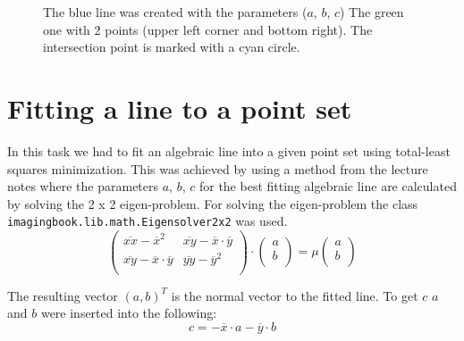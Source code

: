 \begin{figure}
	\centering
	\caption{The blue line was created with the parameters ($a$, $b$, $c$) The green one with 2 points (upper left corner and bottom right). The intersection point is marked with a cyan circle.}
	\label{fig:Result4_1}
\end{figure}



\section{Fitting a line to a point set}
In this task we had to fit an algebraic line into a given point set using total-least squares minimization. This was achieved by using a method from the lecture notes where the parameters $a$, $b$, $c$ for the best fitting algebraic line are calculated by solving the 2 x 2 eigen-problem. For solving the eigen-problem the class \texttt{imagingbook.lib.math.Eigensolver2x2} was used.
\begin{equation}
	\begin{pmatrix}
		\overline{xx} - \overline{x}^2 & \overline{xy} - \overline{x} \cdot \overline{y} \\
		\overline{xy} - \overline{x} \cdot \overline{y} & \overline{yy} - \overline{y}^2 \\
	\end{pmatrix}
	\cdot
	\begin{pmatrix}
		a \\
		b\\
	\end{pmatrix}
	= \mu
	\begin{pmatrix}
		a \\
		b\\
	\end{pmatrix}
\end{equation}

The resulting vector $(a,b)^T$ is the normal vector to the fitted line. To get $c$ $a$ and $b$ were inserted into the following:
\begin{equation}
	c = -\overline{x} \cdot a - \overline{y} \cdot b
\end{equation}

